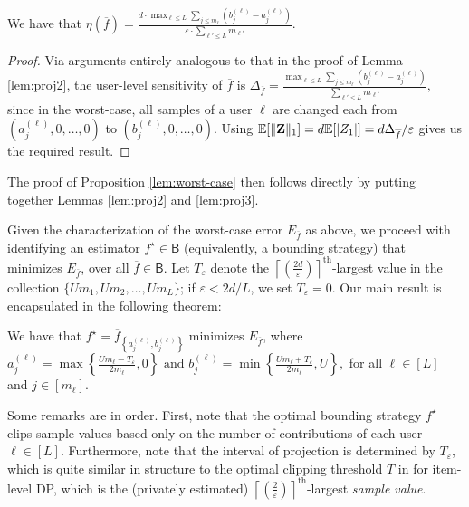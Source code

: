 \begin{lemma}
	\label{lem:proj3}
	We have that $\eta(\overline{f}) = \frac{d\cdot \max_{\ell\leq L} \sum_{j\leq m_\ell} \left(b_j^{(\ell)}-a_j^{(\ell)}\right)}{\varepsilon\cdot \sum_{\ell'\leq L} m_{\ell'}}.$
\end{lemma}
\begin{proof}
Via arguments entirely analogous to that in the proof of Lemma \ref{lem:proj2}, the user-level sensitivity of $\overline{f}$ is
$
	\Delta_{\overline{f}} = \frac{\max_{\ell\leq L} \sum_{j\leq m_\ell} \left(b_j^{(\ell)}-a_j^{(\ell)}\right)}{\sum_{\ell'\leq L} m_{\ell'}},
$
since in the worst-case, all samples of a user $\ell$ are changed each from $(a_j^{(\ell)},0,\ldots,0)$ to $(b_j^{(\ell)},0,\ldots,0)$. Using $\mathbb{E}[\lVert \mathbf{Z}\rVert_1] = d\mathbb{E}[|Z_1|] = d\Delta_{\overline{f}} /\varepsilon$ gives us the required result.
\end{proof}
The proof of Proposition \ref{lem:worst-case} then follows directly by putting together Lemmas \ref{lem:proj2} and \ref{lem:proj3}.


Given the characterization of the worst-case error $E_{\overline{f}}$ as above, we proceed with identifying an estimator $f^\star \in \mathsf{B}$ (equivalently, a bounding strategy) that minimizes $E_{\overline{f}}$, over all $\overline{f}\in \mathsf{B}$. Let $T_\varepsilon$ denote the $\left \lceil \left(\frac{2d}{\varepsilon}\right)\right \rceil^{\text{th}}$-largest value in the collection $\{Um_1,Um_2,\ldots,Um_L\}$; if $\varepsilon<2d/L$, we set $T_\varepsilon = 0$. Our main result is encapsulated in the following theorem:
\begin{theorem}
	\label{thm:opt}
	We have that $f^\star = \overline{f}_{\left\{a_j^{(\ell)},b_j^{(\ell)}\right\}}$ minimizes $E_{\overline{f}}$, where
	$
	a_j^{(\ell)} = \max\left\{\frac{Um_\ell-T_\varepsilon}{2m_\ell},0\right\}\text{ and } b_j^{(\ell)} = \min\left\{\frac{Um_\ell+T_\varepsilon}{2m_\ell},U\right\},
	$
	for all $\ell\in [L]$ and $j\in [m_\ell]$.
\end{theorem}
Some remarks are in order. First, note that the optimal bounding strategy $f^\star$ clips sample values based only on the number of contributions of each user $\ell\in [L]$. Furthermore, note that the interval of projection is determined by $T_\varepsilon$, which is quite similar in structure to the optimal clipping threshold $T$ in \cite{amin} for item-level DP, which is the (privately estimated) $\left \lceil \left(\frac{2}{\varepsilon}\right)\right \rceil^{\text{th}}$-largest \emph{sample value}.

